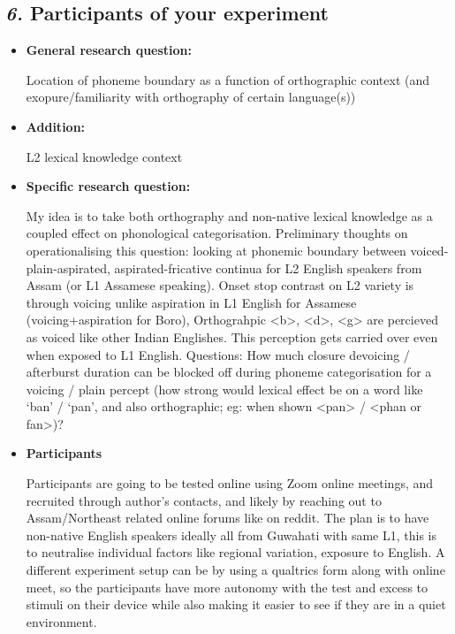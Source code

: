 \documentclass[12pt, english]{article}
\begin{document}
\subsection*{\emph{6.} Participants of your experiment}
\vspace{10pt}

\begin{itemize}
    \item \textbf{General research question:} \par
    Location of phoneme boundary as a function of orthographic context (and exopure/familiarity with orthography of certain language(s))
    \item \textbf{Addition:} \par
    L2 lexical knowledge context
    \item \textbf{Specific research question:} \par
    My idea is to take both orthography and non-native lexical knowledge as a coupled effect on phonological categorisation. Preliminary thoughts on operationalising this question: looking at phonemic boundary between voiced-plain-aspirated, aspirated-fricative continua for L2 English speakers from Assam (or L1 Assamese speaking). Onset stop contrast on L2 variety is through voicing unlike aspiration in L1 English for Assamese (voicing+aspiration for Boro), Orthograhpic <b>, <d>, <g> are percieved as voiced like other Indian Englishes. This perception gets carried over even when exposed to L1 English. Questions: How much closure devoicing / afterburst duration can be blocked off during phoneme categorisation for a voicing / plain percept (how strong would lexical effect be on a word like `ban' / `pan', and also orthographic; eg: when shown <pan> / <phan or fan>)? 
    \item \textbf{Participants} \par
    Participants are going to be tested online using Zoom online meetings, and recruited through author's contacts, and likely by reaching out to Assam/Northeast related online forums like on reddit. The plan is to have non-native English speakers ideally all from Guwahati with same L1, this is to neutralise individual factors like regional variation, exposure to English. A different experiment setup can be by using a qualtrics form along with online meet, so the participants have more autonomy with the test and excess to stimuli on their device while also making it easier to see if they are in a quiet environment.  
\end{itemize}

\end{document}
